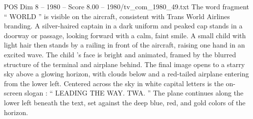 \begin{textsample}{POS Dim 8 – 1980 – Score 8.00 – 1980/tv\_com\_1980\_49.txt}
The word fragment “ WORLD ” is visible on the aircraft, consistent with Trans World Airlines branding.
A silver-haired captain in a dark uniform and peaked cap stands in a doorway or passage, looking forward with a calm, faint smile.
A small child with light hair then stands by a railing in front of the aircraft, raising one hand in an excited wave.
The child ’s face is bright and animated, framed by the blurred structure of the terminal and airplane behind.
The final image opens to a starry sky above a glowing horizon, with clouds below and a red-tailed airplane entering from the lower left.
Centered across the sky in white capital letters is the on-screen slogan : “ LEADING THE WAY.
TWA. ” The plane continues along the lower left beneath the text, set against the deep blue, red, and gold colors of the horizon.

\end{textsample}
